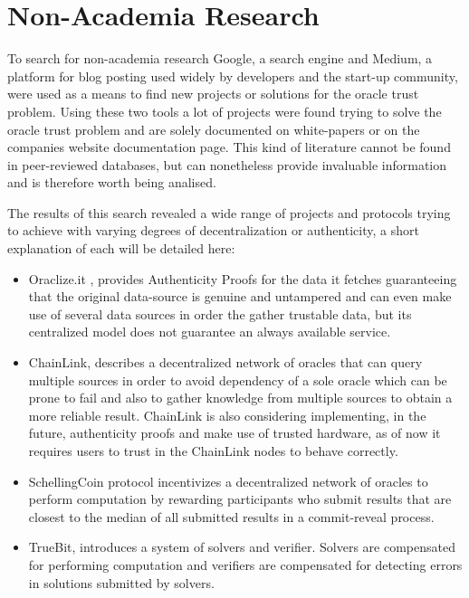 \section{Non-Academia Research}

To search for non-academia research Google, a search engine and Medium, a platform for blog posting used widely by developers and the start-up community, were used as a means to find new projects or solutions for the oracle trust problem. Using these two tools a lot of projects were found trying to solve the oracle trust problem and are solely documented on white-papers or on the companies website documentation page. This kind of literature cannot be found in peer-reviewed databases, but can nonetheless provide invaluable information and is therefore worth being analised.

The results of this search revealed a wide range of projects and protocols trying to achieve with varying degrees of decentralization or authenticity, a short explanation of each will be detailed here: 

\begin{itemize}
\item Oraclize.it \cite{Oraclize.it2018OraclizeDocumentation}, provides Authenticity Proofs for the data it fetches guaranteeing that the original data-source is genuine and untampered and can even make use of several data sources in order the gather trustable data, but its centralized model does not guarantee an always available service.
\item ChainLink\cite{Ellis2017ChainLinkNetwork}, describes a decentralized network of oracles that can query multiple sources in order to avoid dependency of a sole oracle which can be prone to fail and also to gather knowledge from multiple sources to obtain a more reliable result. ChainLink is also considering implementing, in the future, authenticity proofs and make use of trusted hardware, as of now it requires users to trust in the ChainLink nodes to behave correctly.
\item SchellingCoin protocol incentivizes a decentralized network of oracles
to perform computation by rewarding participants who submit results
that are closest to the median of all submitted results in a commit-reveal
process.
\item TrueBit, introduces a system of solvers and verifier. Solvers are
compensated for performing computation and verifiers are compensated
for detecting errors in solutions submitted by solvers.
\end{itemize}


